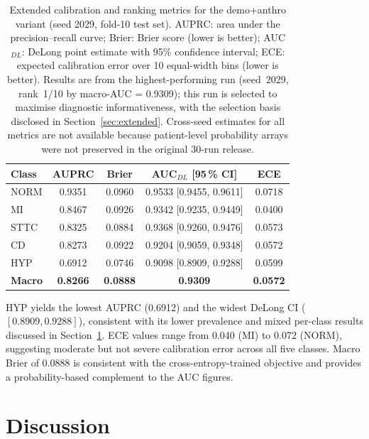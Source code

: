 \documentclass[mathematics,article,submit,pdftex]{Definitions/mdpi}
\def\texttt#1{#1}%
\def\mathrm#1{#1}%
\begin{document}
\begin{table}[H]
\caption{Extended calibration and ranking metrics for the \texttt{demo+anthro} variant (seed 2029, fold-10 test set). AUPRC: area under the precision--recall curve; Brier: Brier score (lower is better); AUC$_{\mathrm{DL}}$: DeLong point estimate with 95\% confidence interval; ECE: expected calibration error over 10 equal-width bins (lower is better). Results are from the highest-performing run (seed~2029, rank~1/10 by macro-AUC = 0.9309); this run is selected to maximise diagnostic informativeness, with the selection basis disclosed in Section~\ref{sec:extended}. Cross-seed estimates for all metrics are not available because patient-level probability arrays were not preserved in the original 30-run release.}\label{tab:extended}
\small\centering
\begin{tabular}{lcccc}
\toprule
\textbf{Class} & \textbf{AUPRC} & \textbf{Brier} & \textbf{AUC$_{\mathrm{DL}}$ [95\,\% CI]} & \textbf{ECE} \\
\midrule
NORM  & 0.9351 & 0.0960 & 0.9533 [0.9455, 0.9611] & 0.0718 \\
MI    & 0.8467 & 0.0926 & 0.9342 [0.9235, 0.9449] & 0.0400 \\
STTC  & 0.8325 & 0.0884 & 0.9368 [0.9260, 0.9476] & 0.0573 \\
CD    & 0.8273 & 0.0922 & 0.9204 [0.9059, 0.9348] & 0.0572 \\
HYP   & 0.6912 & 0.0746 & 0.9098 [0.8909, 0.9288] & 0.0599 \\
\midrule
\textbf{Macro} & \textbf{0.8266} & \textbf{0.0888} & \textbf{0.9309} & \textbf{0.0572} \\
\bottomrule
\end{tabular}
\end{table}

HYP yields the lowest AUPRC (0.6912) and the widest DeLong CI ($[0.8909, 0.9288]$), consistent with its lower prevalence and mixed per-class results discussed in Section~\ref{sec:discussion}. ECE values range from 0.040 (MI) to 0.072 (NORM), suggesting moderate but not severe calibration error across all five classes. Macro Brier of 0.0888 is consistent with the cross-entropy-trained objective and provides a probability-based complement to the AUC figures.

\section{Discussion}\label{sec:discussion}
\end{document}
